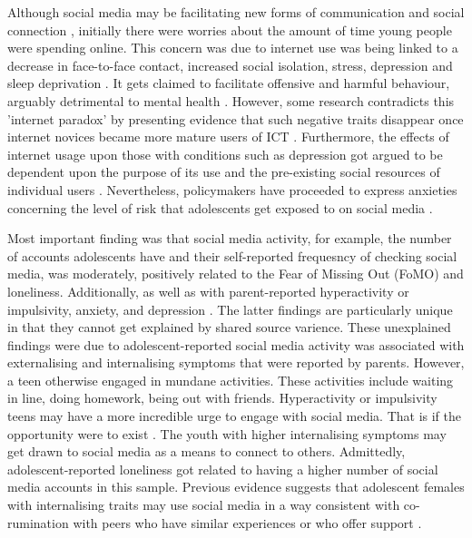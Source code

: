 \documentclass{sigchi}
\begin{document}
	Although social media may be facilitating new forms of communication and social connection \cite{baker2008blogging}, initially there were worries about the amount of time young people were spending online. This concern was due to internet use was being linked to a decrease in face-to-face contact, increased social isolation, stress, depression and sleep deprivation \cite{kraut1998internet, espinoza2011pervasiveness}. It gets claimed to facilitate offensive and harmful behaviour, arguably detrimental to mental health \cite{mesch2009parental}. However, some research contradicts this 'internet paradox' \cite{o2018social} by presenting evidence that such negative traits disappear once internet novices became more mature users of ICT \cite{kraut2002internet}. Furthermore, the effects of internet usage upon those with conditions such as depression got argued to be dependent upon the purpose of its use and the pre-existing social resources of individual users \cite{bessiere2008effects}. Nevertheless, policymakers have proceeded to express anxieties concerning the level of risk that adolescents get exposed to on social media \cite{boyd2014s}.
	
	Most important finding was that social media activity, for example, the number of accounts adolescents have and their self-reported frequesncy of checking social media, was moderately, positively related to the Fear of Missing Out (FoMO) and loneliness. Additionally, as well as with parent-reported hyperactivity or impulsivity, anxiety, and depression \cite{barry2017adolescent}. The latter findings are particularly unique in that they cannot get explained by shared source varience. These unexplained findings were due to adolescent-reported social media activity was associated with externalising and internalising symptoms that were reported by parents. However, a teen otherwise engaged in mundane activities. These activities include waiting in line, doing homework, being out with friends. Hyperactivity or impulsivity teens may have a more incredible urge to engage with social media. That is if the opportunity were to exist \cite{barry2017adolescent}. The youth with higher internalising symptoms may get drawn to social media as a means to connect to others. Admittedly, adolescent-reported loneliness got related to having a higher number of social media accounts in this sample. Previous evidence suggests that adolescent females with internalising traits may use social media in a way consistent with co-rumination with peers who have similar experiences or who offer support \cite{ehrenreich2016adolescents}.
	
\end{document}
